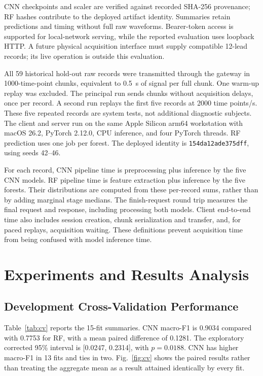 \documentclass[conference,a4paper]{IEEEtran}
\begin{document}
CNN checkpoints and scaler are verified against recorded SHA-256 provenance; RF hashes contribute to the deployed artifact identity. Summaries retain predictions and timing without full raw waveforms. Bearer-token access is supported for local-network serving, while the reported evaluation uses loopback HTTP. A future physical acquisition interface must supply compatible 12-lead records; its live operation is outside this evaluation.

All 59 historical hold-out raw records were transmitted through the gateway in 1000-time-point chunks, equivalent to 0.5~s of signal per full chunk. One warm-up replay was excluded. The principal run sends chunks without acquisition delays, once per record. A second run replays the first five records at 2000 time points/s. These five repeated records are system tests, not additional diagnostic subjects. The client and server run on the same Apple Silicon arm64 workstation with macOS 26.2, PyTorch 2.12.0, CPU inference, and four PyTorch threads. RF prediction uses one job per forest. The deployed identity is \texttt{154da12ade375dff}, using seeds 42--46.

For each record, CNN pipeline time is preprocessing plus inference by the five CNN models. RF pipeline time is feature extraction plus inference by the five forests. Their distributions are computed from these per-record sums, rather than by adding marginal stage medians. The finish-request round trip measures the final request and response, including processing both models. Client end-to-end time also includes session creation, chunk serialization and transfer, and, for paced replays, acquisition waiting. These definitions prevent acquisition time from being confused with model inference time.

\section{Experiments and Results Analysis}
\subsection{Development Cross-Validation Performance}
Table~\ref{tab:cv} reports the 15-fit summaries. CNN macro-F1 is 0.9034 compared with 0.7753 for RF, with a mean paired difference of 0.1281. The exploratory corrected 95\% interval is [0.0247, 0.2314], with $p=0.0188$. CNN has higher macro-F1 in 13 fits and ties in two. Fig.~\ref{fig:cv} shows the paired results rather than treating the aggregate mean as a result attained identically by every fit.
\end{document}
